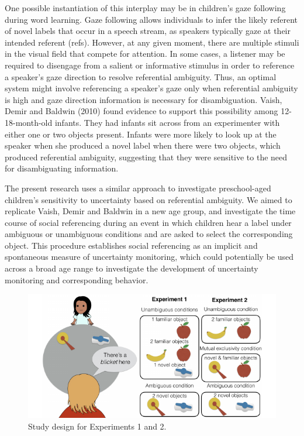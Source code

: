 \documentclass[10pt, letterpaper]{article}
\newenvironment{CodeChunk}{}{}
\begin{document}
One possible instantiation of this interplay may be in children's gaze
following during word learning. Gaze following allows individuals to
infer the likely referent of novel labels that occur in a speech stream,
as speakers typically gaze at their intended referent (refs). However,
at any given moment, there are multiple stimuli in the visual field that
compete for attention. In some cases, a listener may be required to
disengage from a salient or informative stimulus in order to reference a
speaker's gaze direction to resolve referential ambiguity. Thus, an
optimal system might involve referencing a speaker's gaze only when
referential ambiguity is high and gaze direction information is
necessary for disambiguation. Vaish, Demir and Baldwin (2010) found
evidence to support this possibility among 12-18-month-old infants. They
had infants sit across from an experimenter with either one or two
objects present. Infants were more likely to look up at the speaker when
she produced a novel label when there were two objects, which produced
referential ambiguity, suggesting that they were sensitive to the need
for disambiguating information.

The present research uses a similar approach to investigate
preschool-aged children's sensitivity to uncertainty based on
referential ambiguity. We aimed to replicate Vaish, Demir and Baldwin in
a new age group, and investigate the time course of social referencing
during an event in which children hear a label under ambiguous or
unambiguous conditions and are asked to select the corresponding object.
This procedure establishes social referencing as an implicit and
spontaneous measure of uncertainty monitoring, which could potentially
be used across a broad age range to investigate the development of
uncertainty monitoring and corresponding behavior.

\begin{CodeChunk}
\captionsetup{width=0.8\textwidth}\begin{figure}[h]

{\centering \includegraphics{figs/design-1} 

}

\caption[Study design for Experiments 1 and 2]{Study design for Experiments 1 and 2.}\label{fig:design}
\end{figure}
\end{CodeChunk}
\end{document}
